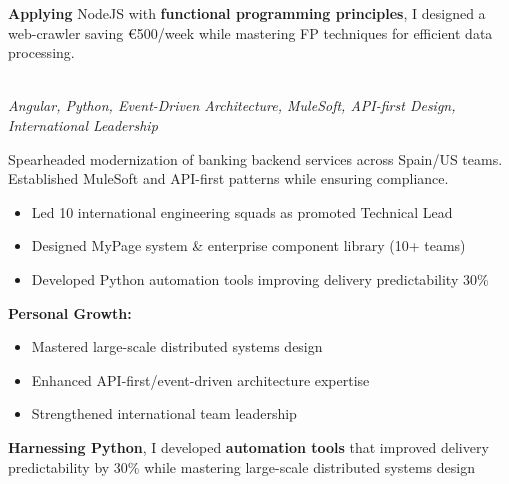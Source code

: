 \documentclass[a4paper,10pt]{article}
\begin{document}
\begin{minipage}{\textwidth}
    \textbf{Applying} NodeJS with \textbf{functional programming principles}, I designed a web-crawler saving €500/week while mastering FP techniques for efficient data processing.

	\vspace{0.4cm}

    \noindent\uline{} \\
    \vspace{0.1cm} \hspace{0.2cm}
	{\small\textit{Angular, Python, Event-Driven Architecture, MuleSoft, API-first Design, International Leadership}}

	Spearheaded modernization of banking backend services across Spain/US teams. Established MuleSoft and API-first patterns while ensuring compliance.

	\vspace{0.2cm}
	\begin{itemize}[label=\textcolor{darkblue}{\textbullet}, leftmargin=*, nosep]
		\item Led 10 international engineering squads as promoted Technical Lead
		\item Designed MyPage system \& enterprise component library (10+ teams)
		\item Developed Python automation tools improving delivery predictability 30\%
	\end{itemize}

	\vspace{0.2cm}
	\textbf{Personal Growth:}
	\vspace{0.2cm}
	\begin{itemize}[label=\textcolor{darkblue}{\textbullet}, leftmargin=*, nosep]
		\item Mastered large-scale distributed systems design
		\item Enhanced API-first/event-driven architecture expertise
		\item Strengthened international team leadership
	\end{itemize}

    \vspace{0.2cm}

    \textbf{Harnessing Python}, I developed \textbf{automation tools} that improved delivery predictability by 30\% while mastering large-scale distributed systems design

	\vspace{0.4cm}


\end{minipage}
\end{document}
